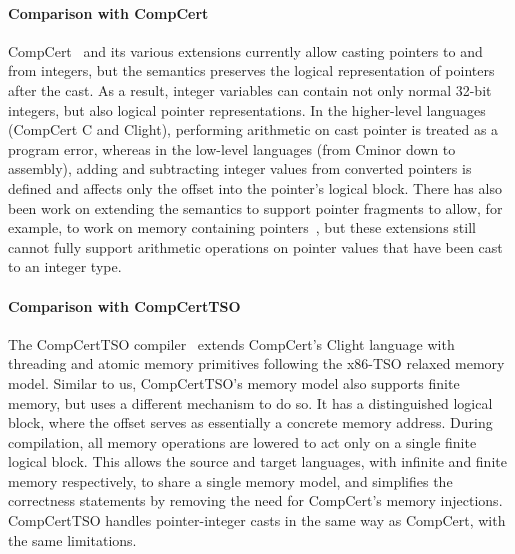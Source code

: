\paragraph{Comparison with CompCert}
CompCert~\cite{leroy:compcert,Leroy-Appel-Blazy-Stewart-memory-v2} and its various extensions
currently allow casting pointers to and from integers, but the
semantics preserves the logical representation of pointers after the cast. 
As a result, integer variables can contain not only normal 32-bit integers,
but also logical pointer representations.
In the higher-level languages (CompCert C and Clight), performing arithmetic
on cast pointer is treated as a program error, whereas in the low-level languages
(from Cminor down to assembly), adding and subtracting integer values 
from converted pointers is defined and affects only the offset into the pointer's 
logical block. There
has also been work on extending the semantics to support pointer
fragments to allow, for example,  to work on memory
containing pointers~\cite{krebbers2014formal}, but these extensions still cannot fully 
support arithmetic operations on pointer values that have been cast
to an integer type.

\paragraph{Comparison with CompCertTSO}
The CompCertTSO compiler~\cite{vsevvcik2013compcerttso} extends CompCert's
Clight language with threading and atomic memory primitives following the
x86-TSO relaxed memory model. Similar to us, CompCertTSO's memory model 
also supports finite memory, but uses a different mechanism to do so.
It has a distinguished logical block, where the offset serves as essentially a
concrete memory address. 
During compilation, all memory operations are
lowered to act only on a single finite logical block. This allows the source
and target languages, with infinite and finite memory respectively, to share a
single memory model, and simplifies the correctness statements by removing
the need for CompCert's memory injections. 
CompCertTSO handles pointer-integer casts in the same way as CompCert, with the same limitations.

